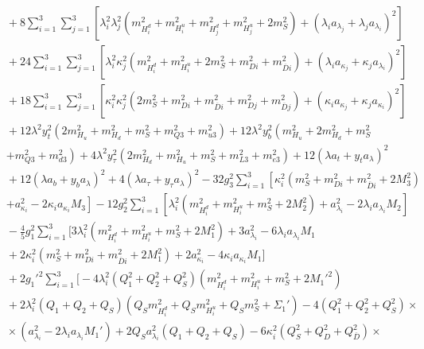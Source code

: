 \documentclass[preprint,amsmath,amssymb,aps,superscriptaddress,prd,showpacs,floatfix,nofootinbib]{revtex4-1}
\begin{document}
\begin{subequations}
\begin{align}
&{}+8\sum_{i=1}^3\sum_{j=1}^3\left [ \lambda_i^2\lambda_j^2\left ( m_{H_i^d}^2+m_{H_i^u}^2+m_{H_j^d}^2+m_{H_j^u}^2+2m_S^2\right )+\left ( \lambda_i a_{\lambda_j}+\lambda_ja_{\lambda_i}\right )^2\right ]\nonumber\\
&{}+24\sum_{i=1}^3\sum_{j=1}^3\left [ \lambda_i^2\kappa_j^2\left ( m_{H_i^d}^2+m_{H_i^u}^2+2m_S^2+m_{Di}^2+m_{\overline{D}i}^2\right )+\left ( \lambda_ia_{\kappa_j}+\kappa_ja_{\lambda_i}\right )^2\right ]\nonumber\\
&{}+18\sum_{i=1}^3\sum_{j=1}^3\left [ \kappa_i^2\kappa_j^2\left ( 2m_S^2+m_{Di}^2+m_{\overline{D}i}^2+m_{Dj}^2+m_{\overline{D}j}^2\right )+\left ( \kappa_ia_{\kappa_j}+\kappa_ja_{\kappa_i}\right )^2\right ]\nonumber\\
&{}+12\lambda^2y_t^2\left ( 2m_{H_u}^2+m_{H_d}^2+m_S^2+m_{Q3}^2+m_{u3}^2\right )+12\lambda^2y_b^2\left ( m_{H_u}^2+2m_{H_d}^2+m_S^2\right.\nonumber\\
&{}\left.+m_{Q3}^2+m_{d3}^2\right )+4\lambda^2y_\tau^2\left ( 2m_{H_d}^2+m_{H_u}^2+m_S^2+m_{L3}^2+m_{e3}^2\right )+12\left ( \lambda a_t+y_ta_{\lambda}\right )^2\nonumber\\
&{}+12\left ( \lambda a_b+y_ba_{\lambda}\right )^2+4\left ( \lambda a_\tau+y_\tau a_{\lambda}\right )^2-32g_3^2\sum_{i=1}^3\left [ \kappa_i^2\left ( m_S^2+m_{Di}^2+m_{\overline{D}i}^2+2M_3^2\right )\right.\nonumber\\
&{}\left.+a_{\kappa_i}^2-2\kappa_ia_{\kappa_i}M_3\right ]-12g_2^2\sum_{i=1}^3\left [ \lambda_i^2\left ( m_{H_i^d}^2+m_{H_i^u}^2+m_S^2+2M_2^2\right )+a_{\lambda_i}^2-2\lambda_i a_{\lambda_i}M_2\right ]\nonumber\\
&{}-\frac{4}{5}g_1^2\sum_{i=1}^3\Big [ 3\lambda_i^2\left ( m_{H_i^d}^2+m_{H_i^u}^2+m_S^2+2M_1^2\right )+3a_{\lambda_i}^2-6\lambda_i a_{\lambda_i}M_1\nonumber\\
&{}+2\kappa_i^2\left ( m_S^2+m_{Di}^2+m_{\overline{D}i}^2+2M_1^2\right )+2a_{\kappa_i}^2-4\kappa_i a_{\kappa_i}M_1\Big ]\nonumber\\
&{}+2g_1'^2\sum_{i=1}^3\Big [ -4\lambda_i^2\left ( Q_1^2+Q_2^2+Q_S^2\right )\left ( m_{H_i^d}^2+m_{H_i^u}^2+m_S^2+2M_1'^2\right )\nonumber\\
&{}+2\lambda_i^2\left ( Q_1+Q_2+Q_S\right )\left ( Q_Sm_{H_i^d}^2+Q_Sm_{H_i^u}^2+Q_Sm_S^2+\Sigma_1'\right )-4\left ( Q_1^2+Q_2^2+Q_S^2\right )\times\nonumber\\
&{}\times\left ( a_{\lambda_i}^2-2\lambda_i a_{\lambda_i}M_1'\right )+2Q_Sa_{\lambda_i}^2\left ( Q_1+Q_2+Q_S\right )-6\kappa_i^2\left ( Q_S^2+Q_D^2+Q_{\overline{D}}^2\right )\times\nonumber\\

\end{align}
\end{subequations}
\end{document}
